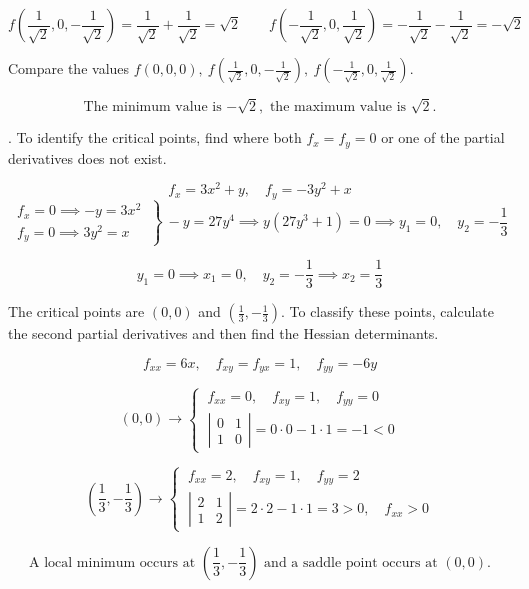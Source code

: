 \documentclass{article}
\begin{document}
\hfill

\[f\left(\frac1{\sqrt2},0,-\frac1{\sqrt2}\right)=\frac1{\sqrt2}+\frac1{\sqrt2}=\sqrt2\qquad f\left(-\frac1{\sqrt2},0,\frac1{\sqrt2}\right)=-\frac1{\sqrt2}-\frac1{\sqrt2}=-\sqrt2\]

\hfill

\noindent Compare the values $\displaystyle f(0,0,0),\:f\left(\frac1{\sqrt2},0,-\frac1{\sqrt2}\right),\:f\left(-\frac1{\sqrt2},0,\frac1{\sqrt2}\right)$.

\hfill

\[\boxed{\text{The minimum value is }{-\sqrt2},\text{ the maximum value is }\sqrt2.}\]

\hfill

. To identify the critical points, find where both $f_x=f_y=0$ or one of the partial derivatives does not exist.

\[f_x=3x^2+y,\quad f_y=-3y^2+x\]
\[\left.\begin{array}{c}
f_x=0\implies-y=3x^2\\
f_y=0\implies3y^2=x 
\end{array}\:\right\}\:-y=27y^4\implies y(27y^3+1)=0\implies y_1=0,\quad y_2=-\frac13\]

\[y_1=0\implies x_1=0,\quad y_2=-\frac13\implies x_2=\frac13\]

\hfill

\noindent The critical points are $(0,0)$ and $\left(\frac13,-\frac13\right)$. To classify these points, calculate the second partial derivatives and then find the Hessian determinants.

\[f_{xx}=6x,\quad f_{xy}=f_{yx}=1,\quad f_{yy}=-6y\]

\[(0,0)\rightarrow\left\{\:\begin{array}{l}
f_{xx}=0,\quad f_{xy}=1,\quad f_{yy}=0\\[1em]
\left|\begin{array}{cc}
0 & 1\\
1 & 0
\end{array}\right|=0\cdot0-1\cdot1=-1<0
\end{array}\right.\]

\[\left(\frac13,-\frac13\right)\rightarrow\left\{\:\begin{array}{l}
f_{xx}=2,\quad f_{xy}=1,\quad f_{yy}=2\\[1em]
\left|\begin{array}{cc}
2 & 1\\
1 & 2
\end{array}\right|=2\cdot2-1\cdot1=3>0,\quad f_{xx}>0
\end{array}\right.\]

\[\boxed{\text{A local minimum occurs at }\left(\frac13,-\frac13\right)\text{ and a saddle point occurs at }(0,0).}\]
\end{document}

